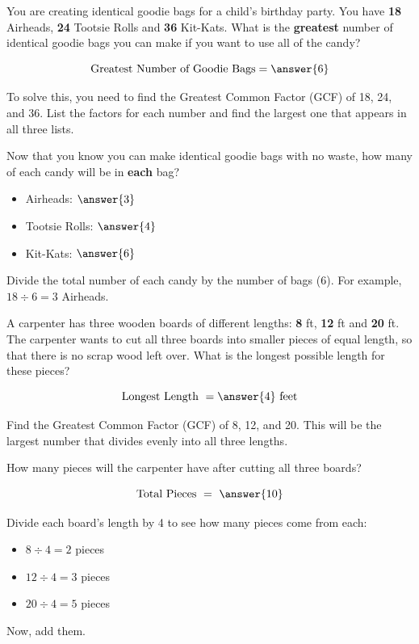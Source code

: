 \documentclass{ximera}[font=12pt]  %
\begin{document}
\begin{problem}
  You are creating identical goodie bags for a child's birthday party.  You have \textbf{18} Airheads, \textbf{24} Tootsie Rolls and
  \textbf{36} Kit-Kats.  What is the \textbf{greatest} number of identical goodie bags you can make if you want to use all of the candy?

  \[ \textrm{Greatest Number of Goodie Bags} = \answer{6} \] 

  \begin{hint}
    To solve this, you need to find the Greatest Common Factor (GCF) of 18, 24, and 36.  List the factors for each number and find the 
    largest one that appears in all three lists.
  \end{hint}

  Now that you know you can make identical goodie bags with no waste, how many of each candy will be in \textbf{each} bag?

  \begin{itemize}
      \item Airheads: $\answer{3}$
      \item Tootsie Rolls: $\answer{4}$
      \item Kit-Kats: $\answer{6}$
  \end{itemize}
  
  \begin{hint}
    Divide the total number of each candy by the number of bags (6). For example, $18 \div 6 = 3$ Airheads.
  \end{hint}


\end{problem}


\begin{problem}
  A carpenter has three wooden boards of different lengths: \textbf{8} ft, \textbf{12} ft and
      \textbf{20} ft.  The carpenter wants to cut all three boards into smaller pieces of equal length,
       so that there is no scrap wood left over. What is the longest possible length for these pieces?

  \[ \textrm{Longest Length } = \answer{4} \ \textrm{feet} \] 

  \begin{hint}
    Find the Greatest Common Factor (GCF) of 8, 12, and 20. This will be the largest number that divides evenly into all three lengths.
  \end{hint}

How many pieces will the carpenter have after cutting all three boards?

  \[ \textrm{Total Pieces } = \ \answer{10} \] 

  \begin{hint}
    Divide each board's length by 4 to see how many pieces come from each:
    \begin{itemize}
        \item $8 \div 4 = 2$ pieces
        \item $12 \div 4 = 3$ pieces
        \item $20 \div 4 = 5$ pieces
    \end{itemize}
    Now, add them.
  \end{hint}
\end{problem}
\end{document}
